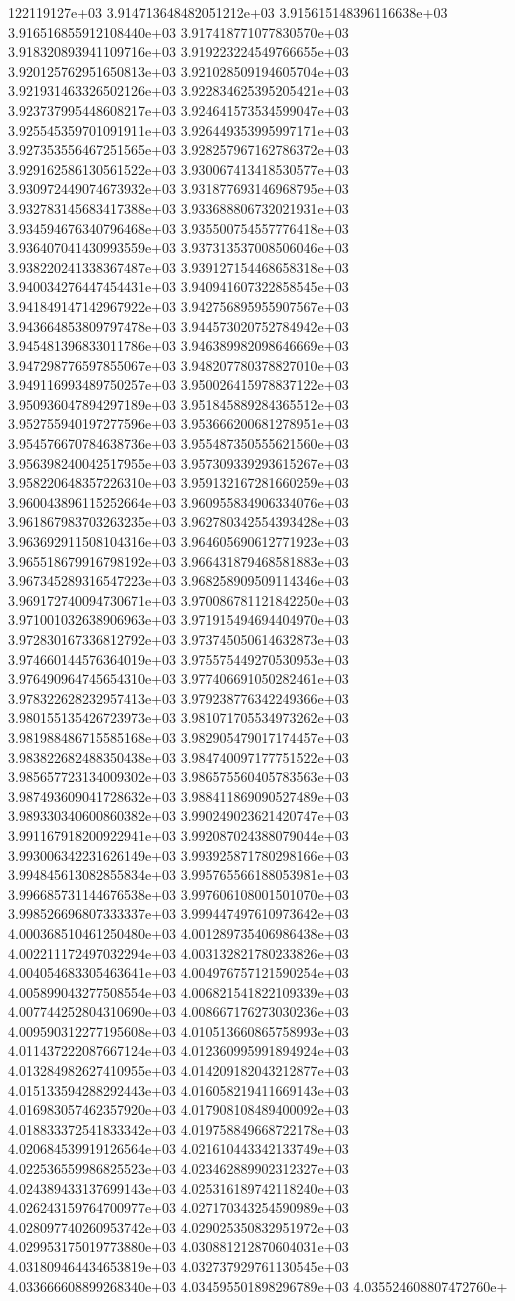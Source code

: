122119127e+03	3.914713648482051212e+03	3.915615148396116638e+03	3.916516855912108440e+03	3.917418771077830570e+03	3.918320893941109716e+03	3.919223224549766655e+03	3.920125762951650813e+03	3.921028509194605704e+03	3.921931463326502126e+03	3.922834625395205421e+03	3.923737995448608217e+03	3.924641573534599047e+03	3.925545359701091911e+03	3.926449353995997171e+03	3.927353556467251565e+03	3.928257967162786372e+03	3.929162586130561522e+03	3.930067413418530577e+03	3.930972449074673932e+03	3.931877693146968795e+03	3.932783145683417388e+03	3.933688806732021931e+03	3.934594676340796468e+03	3.935500754557776418e+03	3.936407041430993559e+03	3.937313537008506046e+03	3.938220241338367487e+03	3.939127154468658318e+03	3.940034276447454431e+03	3.940941607322858545e+03	3.941849147142967922e+03	3.942756895955907567e+03	3.943664853809797478e+03	3.944573020752784942e+03	3.945481396833011786e+03	3.946389982098646669e+03	3.947298776597855067e+03	3.948207780378827010e+03	3.949116993489750257e+03	3.950026415978837122e+03	3.950936047894297189e+03	3.951845889284365512e+03	3.952755940197277596e+03	3.953666200681278951e+03	3.954576670784638736e+03	3.955487350555621560e+03	3.956398240042517955e+03	3.957309339293615267e+03	3.958220648357226310e+03	3.959132167281660259e+03	3.960043896115252664e+03	3.960955834906334076e+03	3.961867983703263235e+03	3.962780342554393428e+03	3.963692911508104316e+03	3.964605690612771923e+03	3.965518679916798192e+03	3.966431879468581883e+03	3.967345289316547223e+03	3.968258909509114346e+03	3.969172740094730671e+03	3.970086781121842250e+03	3.971001032638906963e+03	3.971915494694404970e+03	3.972830167336812792e+03	3.973745050614632873e+03	3.974660144576364019e+03	3.975575449270530953e+03	3.976490964745654310e+03	3.977406691050282461e+03	3.978322628232957413e+03	3.979238776342249366e+03	3.980155135426723973e+03	3.981071705534973262e+03	3.981988486715585168e+03	3.982905479017174457e+03	3.983822682488350438e+03	3.984740097177751522e+03	3.985657723134009302e+03	3.986575560405783563e+03	3.987493609041728632e+03	3.988411869090527489e+03	3.989330340600860382e+03	3.990249023621420747e+03	3.991167918200922941e+03	3.992087024388079044e+03	3.993006342231626149e+03	3.993925871780298166e+03	3.994845613082855834e+03	3.995765566188053981e+03	3.996685731144676538e+03	3.997606108001501070e+03	3.998526696807333337e+03	3.999447497610973642e+03	4.000368510461250480e+03	4.001289735406986438e+03	4.002211172497032294e+03	4.003132821780233826e+03	4.004054683305463641e+03	4.004976757121590254e+03	4.005899043277508554e+03	4.006821541822109339e+03	4.007744252804310690e+03	4.008667176273030236e+03	4.009590312277195608e+03	4.010513660865758993e+03	4.011437222087667124e+03	4.012360995991894924e+03	4.013284982627410955e+03	4.014209182043212877e+03	4.015133594288292443e+03	4.016058219411669143e+03	4.016983057462357920e+03	4.017908108489400092e+03	4.018833372541833342e+03	4.019758849668722178e+03	4.020684539919126564e+03	4.021610443342133749e+03	4.022536559986825523e+03	4.023462889902312327e+03	4.024389433137699143e+03	4.025316189742118240e+03	4.026243159764700977e+03	4.027170343254590989e+03	4.028097740260953742e+03	4.029025350832951972e+03	4.029953175019773880e+03	4.030881212870604031e+03	4.031809464434653819e+03	4.032737929761130545e+03	4.033666608899268340e+03	4.034595501898296789e+03	4.035524608807472760e+